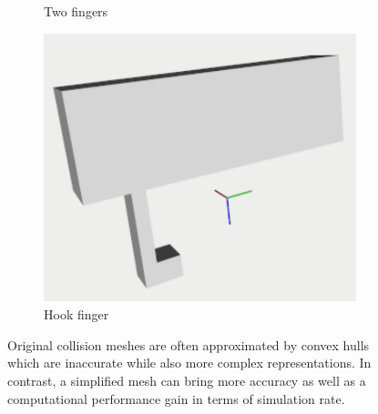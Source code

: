 \begin{figure}[t]
\begin{subfigure}{0.3\columnwidth}
    \caption{Two fingers}\label{fig:two_fingers}
\end{subfigure}%
\hfill
\begin{subfigure}{0.3\columnwidth}
    \includegraphics[width=\linewidth]{framework_manipulation/figures/hardware/single_hook_cropped.pdf}
    \caption{Hook finger}\label{fig:hook_finger}
\end{subfigure}

\caption{Original collision meshes are often approximated by convex hulls which are inaccurate while also more complex representations. In contrast, a simplified mesh can bring more accuracy as well as a computational performance gain in terms of simulation rate.}\label{fig:1}

\end{figure}

 

